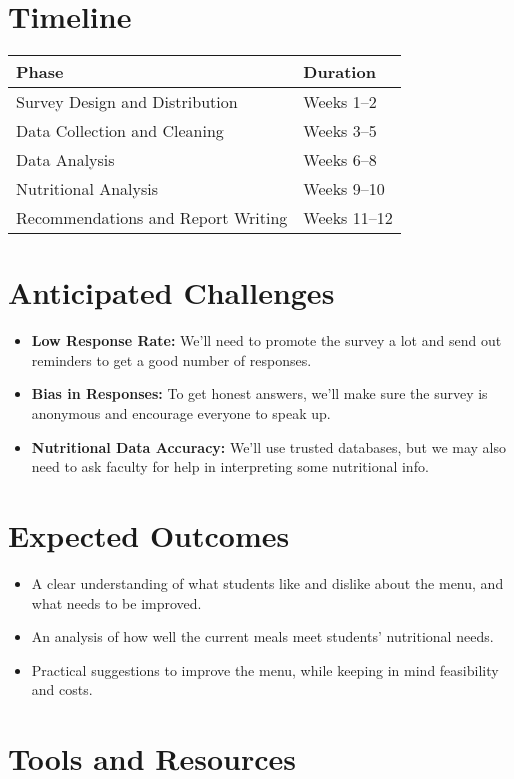 \documentclass[12pt,a4paper]{article}
\begin{document}
\section{Timeline}
\begin{tabular}{|l|l|}
\hline
\textbf{Phase} & \textbf{Duration} \\
\hline
Survey Design and Distribution & Weeks 1--2 \\
Data Collection and Cleaning & Weeks 3--5 \\
Data Analysis & Weeks 6--8 \\
Nutritional Analysis & Weeks 9--10 \\
Recommendations and Report Writing & Weeks 11--12 \\
\hline
\end{tabular}

\section{Anticipated Challenges}
\begin{itemize}
    \item \textbf{Low Response Rate:} We’ll need to promote the survey a lot and send out reminders to get a good number of responses.
    \item \textbf{Bias in Responses:} To get honest answers, we’ll make sure the survey is anonymous and encourage everyone to speak up.
    \item \textbf{Nutritional Data Accuracy:} We’ll use trusted databases, but we may also need to ask faculty for help in interpreting some nutritional info.
\end{itemize}

\section{Expected Outcomes}
\begin{itemize}
    \item A clear understanding of what students like and dislike about the menu, and what needs to be improved.
    \item An analysis of how well the current meals meet students’ nutritional needs.
    \item Practical suggestions to improve the menu, while keeping in mind feasibility and costs.
\end{itemize}

\section{Tools and Resources}
\end{document}
